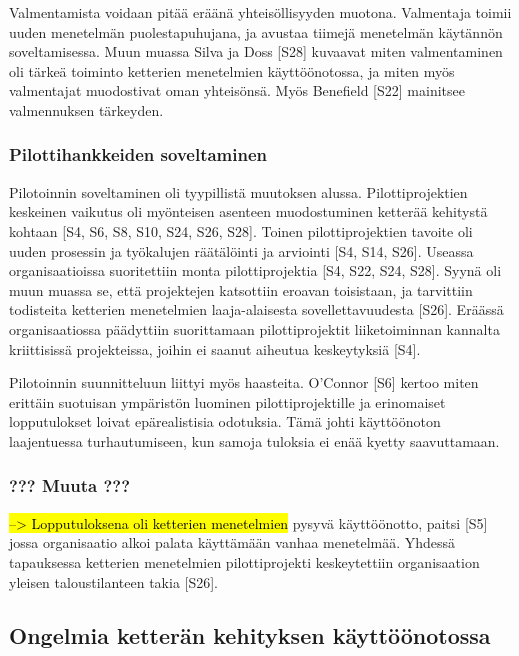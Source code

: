 Valmentamista voidaan pitää eräänä yhteisöllisyyden muotona. Valmentaja toimii
uuden menetelmän puolestapuhujana, ja avustaa tiimejä menetelmän käytännön
soveltamisessa. Muun muassa Silva ja Doss [S28] kuvaavat miten valmentaminen oli
tärkeä toiminto ketterien menetelmien käyttöönotossa, ja miten myös valmentajat
muodostivat oman yhteisönsä. Myös Benefield [S22] mainitsee valmennuksen
tärkeyden.

\subsubsection{Pilottihankkeiden soveltaminen}
\label{subsec:pilotointi}

Pilotoinnin soveltaminen oli tyypillistä muutoksen alussa. Pilottiprojektien
keskeinen vaikutus oli myönteisen asenteen muodostuminen ketterää kehitystä
kohtaan [S4, S6, S8, S10, S24, S26, S28]. Toinen pilottiprojektien tavoite oli
uuden prosessin ja työkalujen räätälöinti ja arviointi [S4, S14, S26].
Useassa organisaatioissa suoritettiin monta pilottiprojektia [S4, S22, S24,
S28]. Syynä oli muun muassa se, että projektejen katsottiin eroavan toisistaan,
ja tarvittiin todisteita ketterien menetelmien laaja-alaisesta
sovellettavuudesta [S26]. Eräässä organisaatiossa päädyttiin suorittamaan
pilottiprojektit liiketoiminnan kannalta kriittisissä projekteissa, joihin ei
saanut aiheutua keskeytyksiä [S4].

Pilotoinnin suunnitteluun liittyi myös haasteita. O'Connor [S6] kertoo miten
erittäin suotuisan ympäristön luominen pilottiprojektille ja erinomaiset
lopputulokset loivat epärealistisia odotuksia. Tämä johti käyttöönoton
laajentuessa turhautumiseen, kun samoja tuloksia ei enää kyetty saavuttamaan.

\subsubsection{??? Muuta ???}

\hl{--> Lopputuloksena oli ketterien menetelmien} pysyvä käyttöönotto, paitsi [S5]
jossa organisaatio alkoi palata käyttämään vanhaa menetelmää. Yhdessä
tapauksessa ketterien menetelmien pilottiprojekti keskeytettiin
organisaation yleisen taloustilanteen takia [S26].

\subsection{Ongelmia ketterän kehityksen käyttöönotossa}

